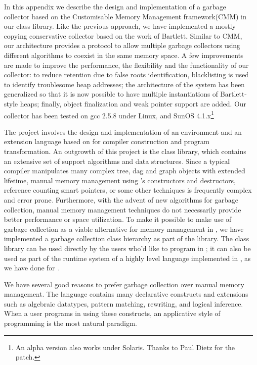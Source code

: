 \pagebreak
\appendix

 \label{appendix:gc}
   In this appendix
we describe the design and implementation of a garbage collector
based on the Customisable Memory Management framework(CMM)\cite{CMM} in our
\Prop{} \Cpp{} class library.  Like the previous approach, we have 
implemented a mostly copying conservative collector based on the work
of Bartlett\cite{Mostly-copying}.  
Similar to CMM, our architecture provides a protocol to allow 
multiple garbage collectors using different algorithms to coexist in the 
same memory space.  A few improvements are made to
improve the performance, the flexibility and the functionality of 
our collector: to reduce retention due to false roots identification,
blacklisting\cite{Boehm} is used to identify troublesome heap
addresses; the architecture of the system has been generalized so that it is 
now possible to have multiple instantiations of Bartlett-style heaps; 
finally, object finalization and weak pointer support
are added.  Our collector has been tested on gcc 2.5.8 under Linux,
and SunOS 4.1.x\footnote{An alpha version also works under Solaris. Thanks
to Paul Dietz for the patch.}

   The \Prop{} project involves the design and implementation of 
an environment and an extension language based on \Cpp{} 
for compiler construction and program transformation.  
An outgrowth of this project is the \Prop{} 
\Cpp{} class library, which contains an extensive set of support algorithms 
and data structures.  Since a typical compiler manipulates many complex tree,
dag and graph objects with extended lifetime, manual memory management using
\Cpp's constructors and destructors, reference counting smart pointers, or
some other techniques is frequently complex and error prone.  
Furthermore, with the advent of new algorithms for garbage collection,
manual memory management techniques do not necessarily provide better 
performance or space utilization.  To make it possible to make use of garbage 
collection as a viable alternative for memory management in
\Cpp\cite{Safe-C++-GC}, we have implemented a garbage collection class 
hierarchy as part of the \Prop{} library.  The class library can be used
directly by the users who'd like to program in \Cpp; it can also be
used as part of the runtime system of a highly level language implemented
in \Cpp, as we have done for \Prop.

   We have several good reasons to prefer garbage collection over manual 
memory management.  The \Prop{} language contains many declarative constructs 
and extensions such as algebraic datatypes, pattern matching, rewriting, and
logical inference.  When a user programs in \Prop{} using these constructs, 
an applicative style of programming is the most natural paradigm.  

